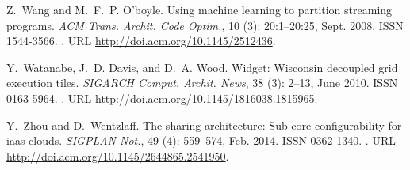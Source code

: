 \documentclass{sigplanconf}
\begin{document}
\begin{thebibliography}{}
Z.~Wang and M.~F.~P. O'boyle.
\newblock Using machine learning to partition streaming programs.
\newblock \emph{ACM Trans. Archit. Code Optim.}, 10 (3):
  20:1--20:25, Sept. 2008.
\newblock ISSN 1544-3566.
\newblock {}.
\newblock URL \url{http://doi.acm.org/10.1145/2512436}.

Y.~Watanabe, J.~D. Davis, and D.~A. Wood.
\newblock Widget: Wisconsin decoupled grid execution tiles.
\newblock \emph{SIGARCH Comput. Archit. News}, 38 (3): 2--13,
  June 2010.
\newblock ISSN 0163-5964.
\newblock {}.
\newblock URL \url{http://doi.acm.org/10.1145/1816038.1815965}.

Y.~Zhou and D.~Wentzlaff.
\newblock The sharing architecture: Sub-core configurability for iaas clouds.
\newblock \emph{SIGPLAN Not.}, 49 (4): 559--574, Feb. 2014.
\newblock ISSN 0362-1340.
\newblock {}.
\newblock URL \url{http://doi.acm.org/10.1145/2644865.2541950}.


\end{thebibliography}
\end{document}
